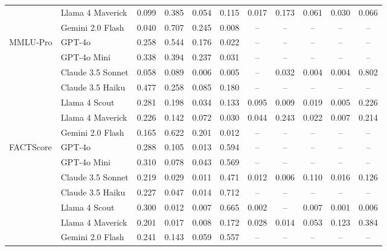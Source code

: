 \begin{table}[htbp]
\begin{tabular}{ll|cccc|cccc|c}
 & Llama 4 Maverick & 0.099 & 0.385 & 0.054 & 0.115 & 0.017 & 0.173 & 0.061 & 0.030 & 0.066 \\
 
 & Gemini 2.0 Flash & 0.040 & 0.707 & 0.245 & 0.008 & -- & -- & -- & -- & -- \\
\cline{1-11}
\multirow{7}{*}{MMLU-Pro}
 & GPT-4o & 0.258 & 0.544 & 0.176 & 0.022 & -- & -- & -- & -- & -- \\
 
 & GPT-4o Mini & 0.338 & 0.394 & 0.237 & 0.031 & -- & -- & -- & -- & -- \\
 
 & Claude 3.5 Sonnet & 0.058 & 0.089 & 0.006 & 0.005 & -- & 0.032 & 0.004 & 0.004 & 0.802 \\
 
 & Claude 3.5 Haiku & 0.477 & 0.258 & 0.085 & 0.180 & -- & -- & -- & -- & -- \\
 
 & Llama 4 Scout & 0.281 & 0.198 & 0.034 & 0.133 & 0.095 & 0.009 & 0.019 & 0.005 & 0.226 \\
 
 & Llama 4 Maverick & 0.226 & 0.142 & 0.072 & 0.030 & 0.044 & 0.243 & 0.022 & 0.007 & 0.214 \\
 
 & Gemini 2.0 Flash & 0.165 & 0.622 & 0.201 & 0.012 & -- & -- & -- & -- & -- \\
\cline{1-11}
\multirow{7}{*}{FACTScore}
 & GPT-4o & 0.288 & 0.105 & 0.013 & 0.594 & -- & -- & -- & -- & -- \\
 
 & GPT-4o Mini & 0.310 & 0.078 & 0.043 & 0.569 & -- & -- & -- & -- & -- \\
 
 & Claude 3.5 Sonnet & 0.219 & 0.029 & 0.011 & 0.471 & 0.012 & 0.006 & 0.110 & 0.016 & 0.126 \\
 
 & Claude 3.5 Haiku & 0.227 & 0.047 & 0.014 & 0.712 & -- & -- & -- & -- & -- \\
 
 & Llama 4 Scout & 0.300 & 0.012 & 0.007 & 0.665 & 0.002 & -- & 0.007 & 0.001 & 0.006 \\
 
 & Llama 4 Maverick & 0.201 & 0.017 & 0.008 & 0.172 & 0.028 & 0.014 & 0.053 & 0.123 & 0.384 \\
 
 & Gemini 2.0 Flash & 0.241 & 0.143 & 0.059 & 0.557 & -- & -- & -- & -- & -- \\
\bottomrule
\end{tabular}
\end{table}

